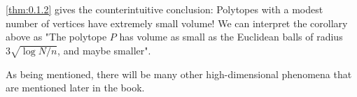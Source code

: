 \begin{remark}
\cref{thm:0.1.2} gives the counterintuitive conclusion: Polytopes with a modest number of vertices have 
extremely small volume! We can interpret the corollary above as "The polytope $P$ has volume as small 
as the Euclidean balls of radius $3 \sqrt{\log{N} / n}$, and maybe smaller".
\end{remark}

As being mentioned, there will be many other high-dimensional phenomena that are mentioned later in the book.
